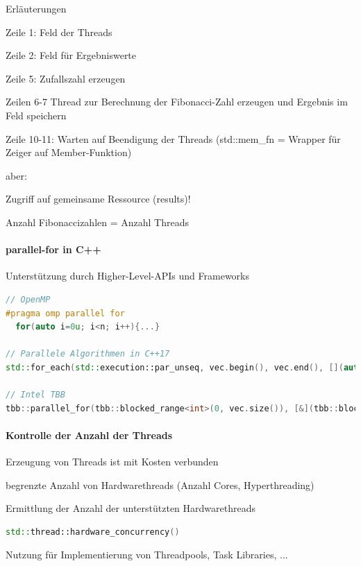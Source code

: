 \documentclass[10pt]{article}
\begin{document}
Erläuterungen
\begin{itemize*}
  \item Zeile 1: Feld der Threads
  \item Zeile 2: Feld für Ergebniswerte
  \item Zeile 5: Zufallszahl erzeugen
  \item Zeilen 6-7 Thread zur Berechnung der Fibonacci-Zahl erzeugen und Ergebnis im Feld speichern
  \item Zeile 10-11: Warten auf Beendigung der Threads (std::mem\_fn = Wrapper für Zeiger auf Member-Funktion)
  \item \color{orange} aber: \color{black}
  \begin{itemize*}
    \item Zugriff auf gemeinsame Ressource (results)!
    \item Anzahl Fibonaccizahlen = Anzahl Threads
  \end{itemize*}
\end{itemize*}

\paragraph{parallel-for in C++}

\begin{itemize*}
  \item Unterstützung durch Higher-Level-APIs und Frameworks
\end{itemize*}
\begin{lstlisting}[language=C++]
// OpenMP
#pragma omp parallel for
  for(auto i=0u; i<n; i++){...}

// Parallele Algorithmen in C++17
std::for_each(std::execution::par_unseq, vec.begin(), vec.end(), [](auto&& item) {...});

// Intel TBB
tbb::parallel_for(tbb::blocked_range<int>(0, vec.size()), [&](tbb::blocked_range<int> r){...});
\end{lstlisting}

\paragraph{Kontrolle der Anzahl der Threads}

\begin{itemize*}
  \item Erzeugung von Threads ist mit Kosten verbunden
  \item begrenzte Anzahl von Hardwarethreads (Anzahl Cores, Hyperthreading)
  \item Ermittlung der Anzahl der unterstützten Hardwarethreads
\end{itemize*}
\begin{lstlisting}[language=C++]
std::thread::hardware_concurrency()
\end{lstlisting}
\begin{itemize*}
  \item Nutzung für Implementierung von Threadpools, Task Libraries, ...
\end{itemize*}
\end{document}
